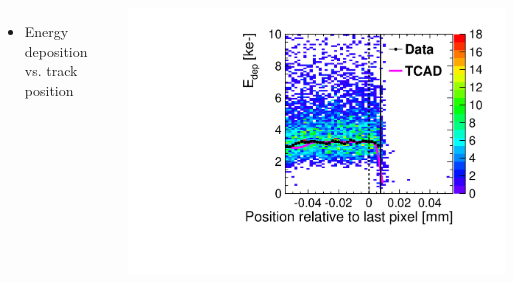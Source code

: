 \begin{frame}
\begin{columns}
    \begin{itemize}
    \item Energy deposition vs. track position
    \end{itemize}
    \centering
    \includegraphics[width=\textwidth]{../figures/ActiveEdge/20_NGR_Edep_TCAD_data.pdf}

  \end{columns}

\end{frame}




